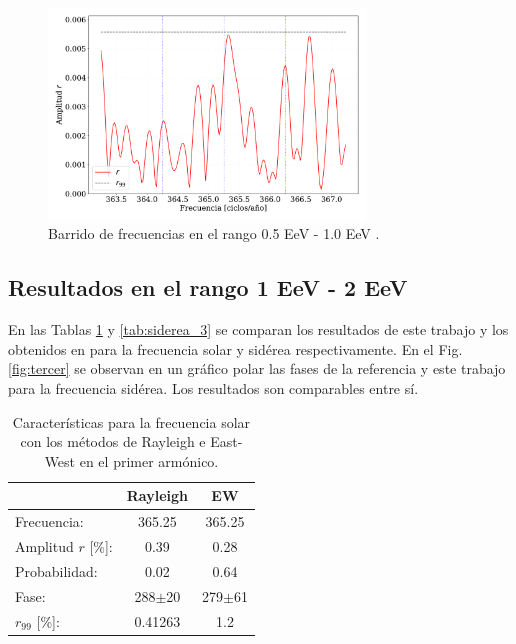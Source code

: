 \documentclass[11pt,papel,oneside,singlespace]{ibtesis}
\begin{document}
    \begin{figure}[H]
        \begin{small}
            \begin{center}
                \includegraphics[width=0.75\textwidth]{plot_bin_2_barrido_v2.pdf}
            \end{center}
            \caption{Barrido de frecuencias en el  rango 0.5 EeV - 1.0 EeV .}
            \label{fig:segundo_barrido}
        \end{small}
    \end{figure}    


\subsection{Resultados en el rango 1 EeV - 2 EeV}

 
En las Tablas \ref{tab:solar_3} y \ref{tab:siderea_3} se comparan los resultados de este trabajo y los obtenidos en \cite{Aab_2020} para la frecuencia solar y sidérea respectivamente. En el Fig.\ref{fig:tercer} se observan en un gráfico polar las fases de la referencia y este trabajo para la frecuencia sidérea. Los resultados son comparables entre sí.
    
    \begin{table}[H]
        \begin{small}
            \begin{center}
                \begin{tabular}[c]{l|c|c}
                                    & Rayleigh      & EW            \\\hline
                    Frecuencia:     & 365.25	    & 365.25        \\
                    Amplitud $r$  [\%]:  & 0.39     & 0.28     \\
                    Probabilidad:   & 0.02          & 0.64          \\
                    Fase:           & 288$\pm$20    & 279$\pm$61    \\
                    $r_{99}$ [\%]:  & 0.41263       & 1.2       \\
                \end{tabular}
            \end{center}
        \end{small}
        \caption{Características para la frecuencia solar con los métodos de Rayleigh  e East-West en el primer armónico.}
        \label{tab:solar_3}
    \end{table}
\end{document}
